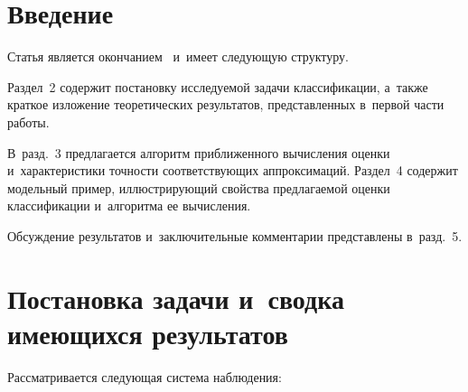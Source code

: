 
\vspace*{12pt}




\thispagestyle{headings}

\begin{multicols}{2}

\label{st\stat}

 \section{Введение}
 
 Статья является окончанием~\cite{B_17} и~имеет следующую структуру. 
 
 Раздел~2 
 содержит постановку исследуемой задачи классификации, а~также краткое изложение 
 теоретических результатов, представленных в~первой части работы. 
 
 В~разд.~3 предлагается алгоритм приближенного вычисления оценки и~характеристики 
 точности соответствующих аппроксимаций. 
 Раздел~4 содержит модельный пример, 
 иллюстрирующий свойства предлагаемой оценки классификации и~алгоритма ее вычисления. 
 
 Обсуждение результатов и~заключительные комментарии представлены в~разд.~5.

  \section{Постановка задачи и~сводка имеющихся результатов}
  
  Рассматривается следующая система наблюдения:
  

\end{multicols}
